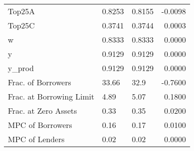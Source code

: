 \begin{table}
\begin{tabular}{lllr}
                  Top25A &  0.8253 &   0.8155 &  -0.0098 \\
                  Top25C &  0.3741 &   0.3744 &   0.0003 \\
                       w &  0.8333 &   0.8333 &   0.0000 \\
                       y &  0.9129 &   0.9129 &   0.0000 \\
                  y\_prod &  0.9129 &   0.9129 &   0.0000 \\
      Frac. of Borrowers &   33.66 &     32.9 &  -0.7600 \\
Frac. at Borrowing Limit &    4.89 &     5.07 &   0.1800 \\
    Frac. at Zero Assets &    0.33 &     0.35 &   0.0200 \\
        MPC of Borrowers &    0.16 &     0.17 &   0.0100 \\
          MPC of Lenders &    0.02 &     0.02 &   0.0000 \\
\bottomrule
\end{tabular}
\end{table}
